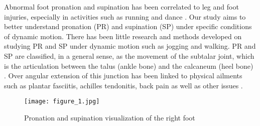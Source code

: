 Abnormal foot pronation and supination has been correlated to leg and foot injuries, especially in activities such as running and dance \parencite{willems}.
Our study aims to better understand pronation (PR) and supination (SP) under specific conditions of dynamic motion.
There has been little research and methods developed on studying PR and SP under dynamic motion such as jogging and walking.
PR and SP are classified, in a general sense, as the movement of the subtalar joint, which is the articulation between the talus (ankle bone) and the calcaneum (heel bone) \parencite{griffiths}.
Over angular extension of this junction has been linked to physical ailments such as plantar fasciitis, achilles tendonitis, back pain as well as other issues \parencite{willems}.\par
\begin{figure}
  \centering
  \texttt{[image: figure\_1.jpg]}
  \caption[Pronation visualization]{Pronation and supination visualization of the right foot \parencite{difference}}
  \label{fig:x pron. visual}
\end{figure}
